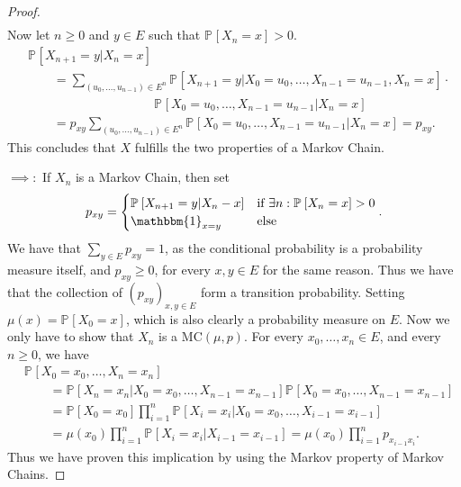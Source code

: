 \begin{proof}
\begin{align}
\end{align}
Now let $n\geq 0$ and $y \in E$ such that $\mathbb{P}_{} \left[ X_n = x \right] > 0$.
\begin{align}
&	\mathbb{P}_{} \left[ X_{n+1} = y | X_n =x \right] \\
&\qquad = \sum_{(u_0, \ldots ,u_{n-1}) \in E^n}^{} \mathbb{P}_{} \left[ X_{n+1}=y | X_0=u_0, \ldots ,X_{n-1}=u_{n-1}, X_n =x \right] \cdot \\
& \qquad \qquad \qquad \qquad \qquad  \mathbb{P}_{} \left[ X_0=u_0, \ldots , X_{n-1}=u_{n-1} | X_n = x \right] \\
&\qquad = p_{xy} \sum_{(u_0, \ldots ,u_{n-1})\in E^n}^{} \mathbb{P}_{} \left[ X_0=u_0, \ldots ,X_{n-1}=u_{n-1} | X_n = x \right] = p_{xy}
.\end{align}
This concludes that $X$ fulfills the two properties of a Markov Chain.

{\color{blue}
	$\implies:$ If $X_n$ is a Markov Chain, then set
	\begin{align}
		p_{xy} = 
	\begin{cases}
		\mathbb{P}_{} \left[ X_{n+1}=y | X_n -x \right] & \textrm{if } \exists n: \mathbb{P}_{} \left[ X_n = x \right] >0 \\
		\mathbbm{1}_{x=y} & \textrm{else}
	\end{cases}.
	\end{align}
	We have that $\sum_{y \in E}^{} p_{xy}=1$, as the conditional probability is a probability measure itself, and $p_{xy}\geq 0$, for every $x, y \in E$ for the same reason. Thus we have that the collection of $(p_{xy})_{x,y \in E}$ form a transition probability. Setting $\mu(x) = \mathbb{P}_{} \left[ X_0 =x \right] $, which is also clearly a probability measure on $E$. Now we only have to show that $X_{n} $ is a $ \textrm{MC}(\mu, p)$. For every $x_0,\ldots , x_n \in E$, and every $n\geq 0$, we have
\begin{align}
& \mathbb{P}_{} \left[ X_0=x_0, \ldots ,X_n=x_n \right] \\ 
	& \qquad = \mathbb{P}_{} \left[ X_n = x_n | X_0=x_0 , \ldots , X_{n-1}=x_{n-1} \right] \mathbb{P}_{} \left[ X_0=x_0 , \ldots , X_{n-1}=x_{n-1} \right] \\
	& \qquad = \mathbb{P}_{} \left[ X_0 = x_0 \right] \prod_{i=1}^{n} \mathbb{P}_{} \left[ X_i = x_i | X_0=x_0, \ldots , X_{i-1}=x_{i-1} \right] \\
	& \qquad = \mu(x_0) \prod_{i=1}^n \mathbb{P}_{} \left[ X_i = x_i | X_{i-1} = x_{i-1}  \right] = \mu(x_0) \prod_{i=1}^n p_{x_{i-1}x_{i}} 
.\end{align}
Thus we have proven this implication by using the Markov property of Markov Chains.

}
\end{proof}
